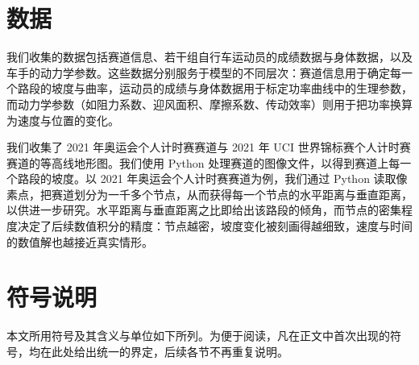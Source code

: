 \documentclass[11pt,a4paper]{ctexart}
\begin{document}
\section{数据}

我们收集的数据包括赛道信息、若干组自行车运动员的成绩数据与身体数据，以及车手的动力学参数。这些数据分别服务于模型的不同层次：赛道信息用于确定每一个路段的坡度与曲率，运动员的成绩与身体数据用于标定功率曲线中的生理参数，而动力学参数（如阻力系数、迎风面积、摩擦系数、传动效率）则用于把功率换算为速度与位置的变化。

我们收集了 2021 年奥运会个人计时赛赛道与 2021 年 UCI 世界锦标赛个人计时赛赛道的等高线地形图。我们使用 Python 处理赛道的图像文件，以得到赛道上每一个路段的坡度。以 2021 年奥运会个人计时赛赛道为例，我们通过 Python 读取像素点，把赛道划分为一千多个节点，从而获得每一个节点的水平距离与垂直距离，以供进一步研究。水平距离与垂直距离之比即给出该路段的倾角，而节点的密集程度决定了后续数值积分的精度：节点越密，坡度变化被刻画得越细致，速度与时间的数值解也越接近真实情形。

\section{符号说明}

本文所用符号及其含义与单位如下所列。为便于阅读，凡在正文中首次出现的符号，均在此处给出统一的界定，后续各节不再重复说明。
\end{document}
